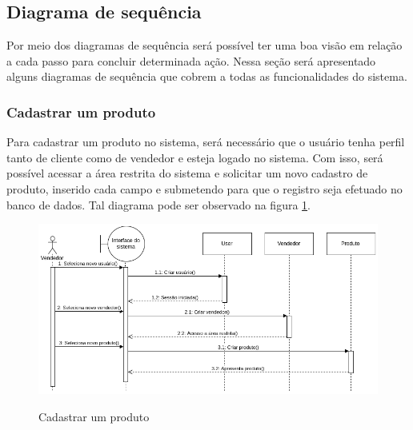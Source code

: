 \subsection{Diagrama de sequência}
Por meio dos diagramas de sequência será possível ter uma boa visão em relação a cada passo para concluir determinada ação. Nessa seção será apresentado alguns diagramas de sequência que cobrem a todas as funcionalidades do sistema.

\subsubsection{Cadastrar um produto}
Para cadastrar um produto no sistema, será necessário que o usuário tenha perfil tanto de cliente como de vendedor e esteja logado no sistema. Com isso, será possível acessar a área restrita do sistema e solicitar um novo cadastro de produto, inserido cada campo e submetendo para que o registro seja efetuado no banco de dados. Tal diagrama pode ser observado na figura \ref{fig:sequence1}.
\begin{figure}[htbp!]
  \centering
  \caption{Cadastrar um produto}
  \includegraphics[width=1\textwidth]{figs/sequence1.png}
    \label{fig:sequence1}
\end{figure}

